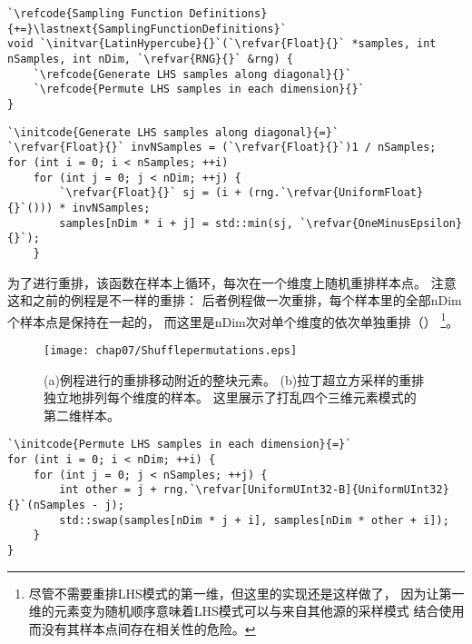 \begin{lstlisting}
`\refcode{Sampling Function Definitions}{+=}\lastnext{SamplingFunctionDefinitions}`
void `\initvar{LatinHypercube}{}`(`\refvar{Float}{}` *samples, int nSamples, int nDim, `\refvar{RNG}{}` &rng) {
    `\refcode{Generate LHS samples along diagonal}{}`
    `\refcode{Permute LHS samples in each dimension}{}`
}
\end{lstlisting}
\begin{lstlisting}
`\initcode{Generate LHS samples along diagonal}{=}`
`\refvar{Float}{}` invNSamples = (`\refvar{Float}{}`)1 / nSamples;
for (int i = 0; i < nSamples; ++i)
    for (int j = 0; j < nDim; ++j) {
        `\refvar{Float}{}` sj = (i + (rng.`\refvar{UniformFloat}{}`())) * invNSamples;
        samples[nDim * i + j] = std::min(sj, `\refvar{OneMinusEpsilon}{}`);
    }
\end{lstlisting}

为了进行重排，该函数在样本上循环，每次在一个维度上随机重排样本点。
注意这和之前的例程是不一样的重排：
后者例程做一次重排，每个样本里的全部{\ttfamily nDim}个样本点是保持在一起的，
而这里是{\ttfamily nDim}次对单个维度的依次单独重排（）
\footnote{尽管不需要重排LHS模式的第一维，但这里的实现还是这样做了，
    因为让第一维的元素变为随机顺序意味着LHS模式可以与来自其他源的采样模式
    结合使用而没有其样本点间存在相关性的危险。}。
\begin{figure}[htbp]
    \centering\texttt{[image: chap07/Shufflepermutations.eps]}
    \caption{(a)例程进行的重排移动附近的整块元素。
        (b)拉丁超立方采样的重排独立地排列每个维度的样本。
        这里展示了打乱四个三维元素模式的第二维样本。}
    \label{fig:7.22}
\end{figure}

\begin{lstlisting}
`\initcode{Permute LHS samples in each dimension}{=}`
for (int i = 0; i < nDim; ++i) {
    for (int j = 0; j < nSamples; ++j) {
        int other = j + rng.`\refvar[UniformUInt32-B]{UniformUInt32}{}`(nSamples - j);
        std::swap(samples[nDim * j + i], samples[nDim * other + i]);
    }
}
\end{lstlisting}

